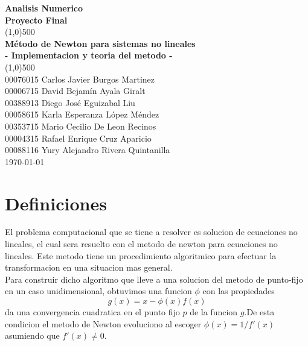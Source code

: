 \documentclass[11pt]{article}
\begin{document}
\begin{titlepage}

\begin{center}
\Large{\textbf{Analisis Numerico}}\\
\Large{\textbf{Proyecto Final}}\\
\vfill
\line(1,0){500}\\[1mm]

\huge{\textbf{Método de Newton para sistemas no lineales}}\\[3mm]
\Large{\textbf{- Implementacion y teoria del metodo -}}\\[1mm]

\line(1,0){500}\\
\vfill
00076015 Carlos Javier Burgos Martinez\\
00006715 David Bejamín Ayala Giralt\\
00388913 Diego José Eguizabal Liu\\
00058615 Karla Esperanza López Méndez\\
00353715 Mario Cecilio De Leon Recinos\\
00004315 Rafael Enrique Cruz Aparicio \\
00088116 Yury Alejandro Rivera Quintanilla\\
\vfill
\today\\

\end{center}

\end{titlepage}

\tableofcontents
\thispagestyle{empty}
\clearpage

\setcounter{page}{1}

\section{Definiciones}

El problema computacional que se tiene a resolver es solucion de ecuaciones no lineales, el cual sera resuelto con el metodo de newton para ecuaciones no lineales. Este metodo tiene un procedimiento algoritmico para efectuar la transformacion en una situacion mas general.\\

Para construir dicho algoritmo que lleve a una solucion del metodo de punto-fijo en un caso unidimensional, obtuvimos una funcion $\phi$ con las propiedades $$g(x)=x-\phi(x)f(x)$$ da una convergencia cuadratica en el punto fijo $p$ de la funcion $g$.De esta condicion el metodo de Newton evoluciono al escoger $\phi(x)=1/f'(x)$ asumiendo que $f'(x)\neq0$.\\
\end{document}
